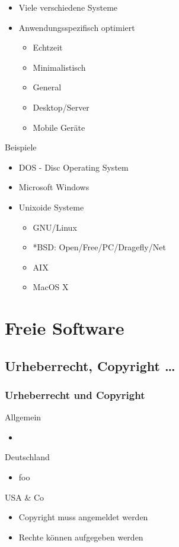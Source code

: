 \documentclass[]{beamer}
\begin{document}
\begin{frame}
	\begin{block}{}
		\begin{itemize}
			\item Viele verschiedene Systeme 
			\item Anwendungsspezifisch optimiert
				\begin{itemize}
					\item Echtzeit
					\item Minimalistisch
					\item General
					\item Desktop/Server
					\item Mobile Geräte 
				\end{itemize}
		\end{itemize}
	\end{block}
	\begin{block}{Beispiele}
		\begin{itemize}
			\item DOS - Disc Operating System
			\item Microsoft Windows
			\item Unixoide Systeme
				\begin{itemize}
					\item GNU/Linux
					\item *BSD: Open/Free/PC/Dragefly/Net
					\item AIX
					\item MacOS X
				\end{itemize}
		\end{itemize}
	\end{block}
\end{frame}

\section{Freie Software}
\subsection{Urheberrecht, Copyright \dots}
\begin{frame}
	\frametitle{Urheberrecht und Copyright}
	\begin{block}{Allgemein}
		\begin{itemize}
			\item 
		\end{itemize}
	\end{block}
	\begin{block}{Deutschland}
		\begin{itemize}
			\item foo
		\end{itemize}
	\end{block}
	\begin{block}{USA \& Co}
		\begin{itemize}
			\item Copyright muss angemeldet werden
			\item Rechte können aufgegeben werden
		\end{itemize}
	\end{block}
\end{frame}
\end{document}
